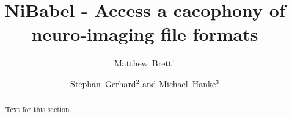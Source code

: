 \documentclass[10pt]{bmc_article}
\newenvironment{bmcformat}{\baselineskip20pt\sloppy\setboolean{publ}{false}}{\baselineskip20pt\sloppy}
\begin{document}
\begin{bmcformat}

\title{NiBabel - Access a cacophony of neuro-imaging file formats}



\author{Matthew~Brett\correspondingauthor$^1$%
       \and
         Stephan~Gerhard$^2$ %
       and
         Michael~Hanke$^3$%
      }

\address{%
    \iid(1)Helen Wills Neuroscience Institute, University of California at
Berkeley, USA\\
    \iid(2)Institute of Neuroinformatics, University Zurich and Swiss Federal Institute of Technology, Zurich, Switzerland\\
    \iid(3)Department of Experimental Psychology, University of Magdeburg,
Magdeburg, Germany}%

\maketitle



\begin{abstract}
Text for this section.        
\end{abstract}




\end{bmcformat}
\end{document}
